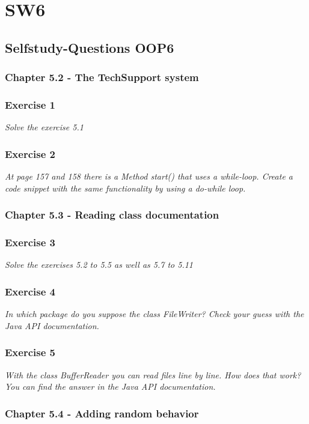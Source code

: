 \section{SW6}
\subsection{Selfstudy-Questions OOP6}

\subsubsection{Chapter 5.2 - The TechSupport system}

\subsubsection*{Exercise 1}
\textit{Solve the exercise 5.1}

\subsubsection*{Exercise 2}
\textit{At page 157 and 158 there is a Method start() that uses a 
while-loop. Create a code snippet with the same functionality by using a
do-while loop.}

\subsubsection{Chapter 5.3 - Reading class documentation}

\subsubsection*{Exercise 3}
\textit{Solve the exercises 5.2 to 5.5 as well as 5.7 to 5.11}

\subsubsection*{Exercise 4}
\textit{In which package do you suppose the class FileWriter?
Check your guess with the Java API documentation.}

\subsubsection*{Exercise 5}
\textit{With the class BufferReader you can read files line by line.
How does that work? You can find the answer in the Java API documentation.}

\subsubsection{Chapter 5.4 - Adding random behavior}

